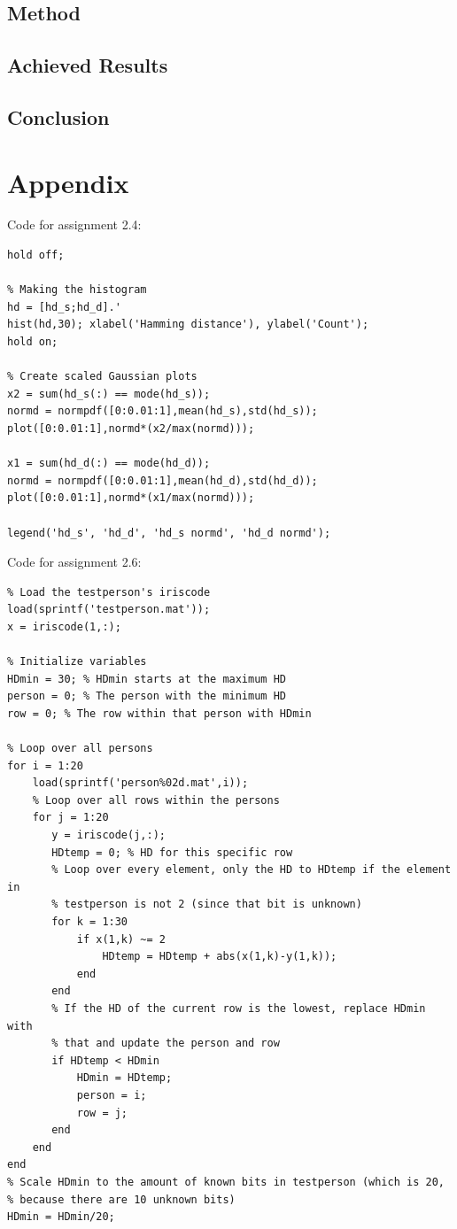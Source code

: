 \documentclass{article}
\begin{document}
\subsection{Method}
\subsection{Achieved Results}
\subsection{Conclusion}




\section*{Appendix}
Code for assignment 2.4:
\begin{lstlisting}
hold off;

% Making the histogram
hd = [hd_s;hd_d].'
hist(hd,30); xlabel('Hamming distance'), ylabel('Count');
hold on;

% Create scaled Gaussian plots
x2 = sum(hd_s(:) == mode(hd_s));
normd = normpdf([0:0.01:1],mean(hd_s),std(hd_s));
plot([0:0.01:1],normd*(x2/max(normd)));

x1 = sum(hd_d(:) == mode(hd_d));
normd = normpdf([0:0.01:1],mean(hd_d),std(hd_d));
plot([0:0.01:1],normd*(x1/max(normd)));

legend('hd_s', 'hd_d', 'hd_s normd', 'hd_d normd');
\end{lstlisting}

Code for assignment 2.6:
\begin{lstlisting}
% Load the testperson's iriscode
load(sprintf('testperson.mat')); 
x = iriscode(1,:);

% Initialize variables
HDmin = 30; % HDmin starts at the maximum HD
person = 0; % The person with the minimum HD
row = 0; % The row within that person with HDmin

% Loop over all persons
for i = 1:20
    load(sprintf('person%02d.mat',i));
    % Loop over all rows within the persons
    for j = 1:20
       y = iriscode(j,:);
       HDtemp = 0; % HD for this specific row
       % Loop over every element, only the HD to HDtemp if the element in
       % testperson is not 2 (since that bit is unknown)
       for k = 1:30
           if x(1,k) ~= 2
               HDtemp = HDtemp + abs(x(1,k)-y(1,k));
           end
       end
       % If the HD of the current row is the lowest, replace HDmin with
       % that and update the person and row
       if HDtemp < HDmin
           HDmin = HDtemp;
           person = i;
           row = j;
       end
    end
end
% Scale HDmin to the amount of known bits in testperson (which is 20,
% because there are 10 unknown bits)
HDmin = HDmin/20;
\end{lstlisting}
\end{document}
